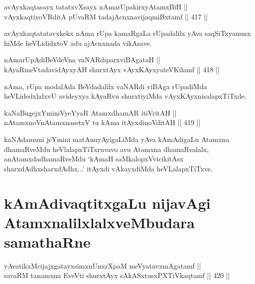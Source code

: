 
\begin{shl}
avAyxkaqtasayx tatatxvXsayx nAmarUpakirxyAtamxBiH || \\
vAyxkaqtiyoVRditA pUvaRM tadajAcnxnavijaqmiBxtamf \hfill || 417 ||  
\end{shl}

\begin{artha}
avAyxkaqtatatavxkekx nAma rUpa kamaRgaLa rUpadalilx yAva saqSiTxyanunx
hiMde heVLididxtoV adu ajAcnxnada vikAsave.
\end{artha}


\begin{shl}
nAmarUpAdiBeVdeVna vaNARdiparxviBAgataH || \\
kAyaRmeVtadavidAyxyAH shurxtAyx vAyxKAyxyateV\s Kilamf \hfill || 418 ||  
\end{shl}

\begin{artha}
nAma, rUpa modalAda BeVdadalilx vaNARdi viBAga rUpadiMda
heVLidedxlalxvU avideyxya kAyaRvu shurxtiyiMda vAyxKAyxnisalapxTiTxde.
\end{artha}


\begin{shl}
kaNaBugejxYminiVyeYyaR AtamxdhamAR itiVritAH || \\
nA\s \s tamxnoV\s nAtamxnasetxV tu kAma itAyxdinoVditAH \hfill || 419 || 
\end{shl}

\begin{artha}
kaNAdamuni jeYmini matAnuyAyigaLiMda yAva kAmAdigaLu Atamxna
dhamaRveMdu heVlalapxTiTxruvavo avu Atamxna dhamaRvalalx,
anAtamxdadhamaRveMdu `kAmaH saMkalopxVvicikitAsx sharxdAdhx\s sharxdAdhx...' itAyxdi vAkayxdiMda heVLalapxTiTxve.
\end{artha}

\section*{kAmAdivaqtitxgaLu nijavAgi AtamxnalilxlalxveMbudara samathaRne}


\begin{shl}
yAvatikxMcijajxgatayxsimxnUnxrXpaM meVyatavxmAgatamf || \\
savaRM tanamxna EveVti shurxtAyx sAkASxtusxPXTiVkaqtamf \hfill || 420 ||  
\end{shl}

